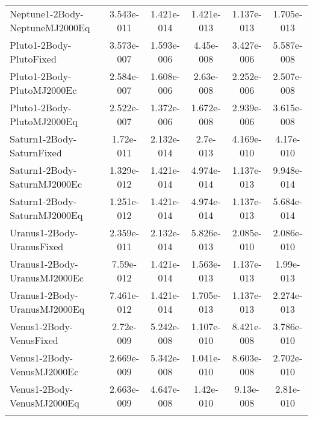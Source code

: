 \begin{table}[htbp!]
\begin{tabular}{lccccc}
         Neptune1-2Body-NeptuneMJ2000Eq & 3.543e-011 & 1.421e-014 & 1.421e-013 & 1.137e-013 & 1.705e-013 \\
         Pluto1-2Body-PlutoFixed & 3.573e-007 & 1.593e-006 & 4.45e-008 & 3.427e-006 & 5.587e-008 \\
         Pluto1-2Body-PlutoMJ2000Ec & 2.584e-007 & 1.608e-006 & 2.63e-008 & 2.252e-006 & 2.507e-008 \\
         Pluto1-2Body-PlutoMJ2000Eq & 2.522e-007 & 1.372e-006 & 1.672e-008 & 2.939e-006 & 3.615e-008 \\
         Saturn1-2Body-SaturnFixed & 1.72e-011 & 2.132e-014 & 2.7e-013 & 4.169e-010 & 4.17e-010 \\
         Saturn1-2Body-SaturnMJ2000Ec & 1.329e-012 & 1.421e-014 & 4.974e-014 & 1.137e-013 & 9.948e-014 \\
         Saturn1-2Body-SaturnMJ2000Eq & 1.251e-012 & 1.421e-014 & 4.974e-014 & 1.137e-013 & 5.684e-014 \\
         Uranus1-2Body-UranusFixed & 2.359e-011 & 2.132e-014 & 5.826e-013 & 2.085e-010 & 2.086e-010 \\
         Uranus1-2Body-UranusMJ2000Ec & 7.59e-012 & 1.421e-014 & 1.563e-013 & 1.137e-013 & 1.99e-013 \\
         Uranus1-2Body-UranusMJ2000Eq & 7.461e-012 & 1.421e-014 & 1.705e-013 & 1.137e-013 & 2.274e-013 \\
         Venus1-2Body-VenusFixed & 2.72e-009 & 5.242e-008 & 1.107e-010 & 8.421e-008 & 3.786e-010 \\
         Venus1-2Body-VenusMJ2000Ec & 2.669e-009 & 5.342e-008 & 1.041e-010 & 8.603e-008 & 2.702e-010 \\
         Venus1-2Body-VenusMJ2000Eq & 2.663e-009 & 4.647e-008 & 1.42e-010 & 9.13e-008 & 2.81e-010 \\
      \hline\hline
      \label{Table: LinuxGMAT-MacGMAT CS Parameters Set 5} 
\end{tabular}
\end{table}
